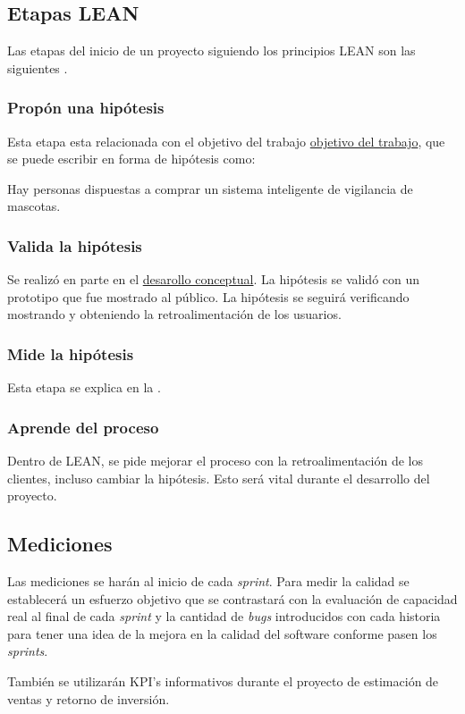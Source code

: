 \subsection{Etapas LEAN}

Las etapas del inicio de un proyecto siguiendo los principios LEAN son las siguientes \parencite{cardenas}.

\subsubsection{Propón una hipótesis}

Esta etapa esta relacionada con el objetivo del trabajo \hyperref[sec:objetivos]{objetivo del trabajo}, que se puede escribir en forma de hipótesis como:

\begin{quotebox}
Hay personas dispuestas a comprar un sistema inteligente de vigilancia de mascotas.
\end{quotebox}

\subsubsection{Valida la hipótesis}

Se realizó en parte en el \hyperref[sec:desarrolloconceptual]{desarollo conceptual}. La hipótesis se validó con un prototipo que fue mostrado al público. La hipótesis se seguirá verificando mostrando y obteniendo la retroalimentación de los usuarios.

\subsubsection{Mide la hipótesis}

Esta etapa se explica en la .

\subsubsection{Aprende del proceso}

Dentro de LEAN, se pide mejorar el proceso con la retroalimentación de los clientes, incluso cambiar la hipótesis. Esto será vital durante el desarrollo del proyecto.

\subsection{Mediciones}
\label{sec:mediciones}

Las mediciones se harán al inicio de cada \textit{sprint}. Para medir la calidad se establecerá un esfuerzo objetivo que se contrastará con la evaluación de capacidad real al final de cada \textit{sprint} y la cantidad de \textit{bugs} introducidos con cada historia para tener una idea de la mejora en la calidad del software conforme pasen los \textit{sprints}.

También se utilizarán KPI's informativos durante el proyecto de estimación de ventas y retorno de inversión.









